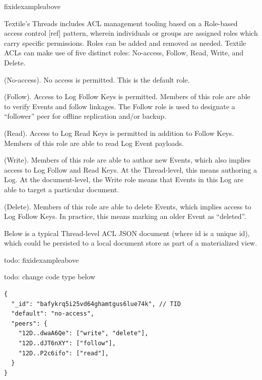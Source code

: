 \documentclass{comjnl}
\begin{document}
fixidexampleabove

Textile’s Threads includes ACL management tooling based on a Role-based access control [ref] pattern, wherein individuals or groups are assigned roles which carry specific permissions. Roles can be added and removed as needed. Textile ACLs can make use of five distinct roles: No-access, Follow, Read, Write, and Delete.

\begin{definition}
(No-access). No access is permitted. This is the default role.
\end{definition}

\begin{definition}
(Follow). Access to Log Follow Keys is permitted. Members of this role are able to verify Events and follow linkages. The Follow role is used to designate a “follower” peer for offline replication and/or backup.
\end{definition}

\begin{definition}
(Read). Access to Log Read Keys is permitted in addition to Follow Keys. Members of this role are able to read Log Event payloads.
\end{definition}

\begin{definition}
(Write). Members of this role are able to author new Events, which also implies access to Log Follow and Read Keys. At the Thread-level, this means authoring a Log. At the document-level, the Write role means that Events in this Log are able to target a particular document.
\end{definition}

\begin{definition}
(Delete). Members of this role are able to delete Events, which implies access to Log Follow Keys. In practice, this means marking an older Event as “deleted”.
\end{definition}

Below is a typical Thread-level ACL JSON document (where id is a unique id), which could be persisted to a local document store as part of a materialized view.

todo: fixidexampleabove 

todo: change code type below

\begin{lstlisting}
{
  "_id": "bafykrq5i25vd64ghamtgus6lue74k", // TID
  "default": "no-access",
  "peers": {
    "12D..dwaA6Qe": ["write", "delete"],
    "12D..dJT6nXY": ["follow"],
    "12D..P2c6ifo": ["read"],
  }
}
\end{lstlisting}
\end{document}
